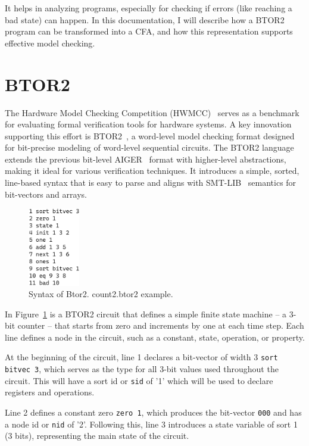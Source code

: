 It helps in analyzing programs, especially for checking if errors (like reaching a bad state) can happen. In this documentation, I will describe how a BTOR2 program can be transformed into a CFA, and how this representation supports effective model checking.

\section{BTOR2}
The Hardware Model Checking Competition (HWMCC)~\cite{hwmcc} serves as a benchmark for evaluating formal verification tools for hardware systems. A key innovation supporting this effort is BTOR2~\cite{btor2}, a word-level model checking format designed for bit-precise modeling of word-level sequential circuits.
The BTOR2 language extends the previous bit-level AIGER~\cite{AIGER} format with higher-level abstractions, making it ideal for various verification techniques. It introduces a simple, sorted, line-based syntax that is easy to parse and aligns with SMT-LIB~\cite{SMT-LIB} semantics for bit-vectors and arrays.

\begin{figure}
  \centering
  \includegraphics[width=0.2\textwidth]{figures/count2.png}
  \caption{ Syntax of Btor2. count2.btor2 example. }
  \label{fig:count2}
\end{figure}

In Figure~\ref{fig:count2} is a BTOR2 circuit that defines a simple finite state machine -- a 3-bit counter -- that starts from zero and increments by one at each time step. Each line defines a node in the circuit, such as a constant, state, operation, or property.

At the beginning of the circuit, line 1 declares a bit-vector of width 3 \verb|sort bitvec 3|, which serves as the type for all 3-bit values used throughout the circuit. This will have a sort id or \verb|sid| of '1' which will be used to declare registers and operations.

Line 2 defines a constant zero \verb|zero 1|, which produces the bit-vector \verb|000| and has a node id or \verb|nid| of '2'. Following this, line 3 introduces a state variable of sort 1 (3 bits), representing the main state of the circuit.

